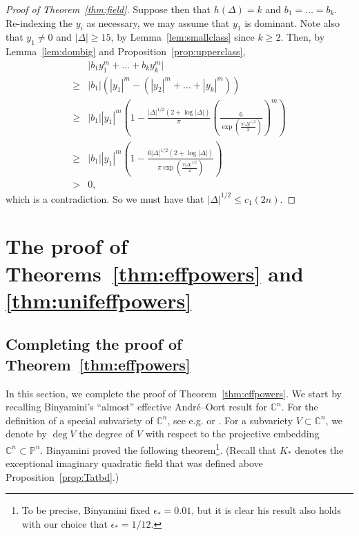 \documentclass[11pt,a4paper, british]{amsart}
\theoremstyle{definition}
\theoremstyle{remark}
\numberwithin{equation}{section}
\newcommand{\C}{\mathbb{C}} %
\begin{document}
\begin{proof}[Proof of Theorem~\ref{thm:field}]
	 Suppose then that $h(\Delta) = k$ and $b_1 = \ldots = b_k$. Re-indexing the $y_i$ as necessary, we may assume that $y_1$ is dominant. Note also that $y_1 \neq 0$ and $\lvert \Delta \rvert \geq 15$, by Lemma~\ref{lem:smallclass} since $k \geq 2$. Then, by Lemma~\ref{lem:dombig} and Proposition~\ref{prop:upperclass}, 
	 \begin{align*}
	 	&\lvert b_1 y_1^m + \ldots + b_k y_k^m \rvert\\ \geq &\left\lvert b_1 \right\rvert \left( \left\lvert y_1 \right\rvert^m - \left( \left\lvert y_2 \right\rvert^m + \ldots + \left\rvert y_k \right\rvert^m \right) \right) \\
	 	\geq &\left\lvert b_1 \right \rvert \left \lvert y_1 \right\rvert^m \left(1-   \frac{\lvert \Delta \rvert^{1/2} (2 + \log \lvert \Delta \rvert)}{\pi}\left(\frac{6}{ \exp\left(\frac{\pi \lvert \Delta \rvert^{1/2}}{2}\right)}\right)^m\right)\\
	 	\geq &\left\lvert b_1 \right \rvert \left \lvert y_1 \right\rvert^m \left(1-   \frac{6 \lvert \Delta \rvert^{1/2} (2 + \log \lvert \Delta \rvert) }{ \pi \exp\left(\frac{\pi \lvert \Delta \rvert^{1/2}}{2}\right)}\right)\\
	 	>&0,
	 	\end{align*}
 	which is a contradiction. So we must have that $\lvert \Delta \rvert^{1/2} \leq c_1(2n)$. 
	\end{proof}
	
	\section{The proof of Theorems~\ref{thm:effpowers} and \ref{thm:unifeffpowers}}\label{sec:pf}
	

\subsection{Completing the proof of Theorem~\ref{thm:effpowers}}

In this section, we complete the proof of Theorem~\ref{thm:effpowers}. We start by recalling Binyamini's \cite{Binyamini19} ``almost'' effective Andr\'e--Oort result for $\C^n$. For the definition of a special subvariety of $\C^n$, see e.g. \cite[(1.1)]{Binyamini19} or \cite[Definition~4.10]{Pila22}. For a subvariety $V \subset \C^n$, we denote by $\deg V$ the degree of $V$ with respect to the projective embedding $\C^n \subset \mathbb{P}^n$. Binyamini proved the following theorem\footnote{To be precise, Binyamini \cite[\S2.2]{Binyamini19} fixed $\epsilon_* = 0.01$, but it is clear his result also holds with our choice that $\epsilon_* = 1/12$.}. (Recall that $K_*$ denotes the exceptional imaginary quadratic field that was defined above Proposition~\ref{prop:Tatbd}.)
\end{document}

